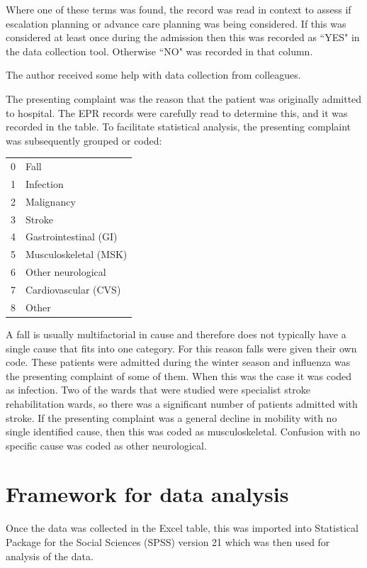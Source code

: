 \documentclass
[
	12pt,
	a4paper,
	oneside,
]{report}
\begin{document}
Where one of these terms was found, the record was read in context to assess if 
escalation planning or advance care planning was being considered. If this
was considered at least once during the admission then this was recorded as 
``YES"
in the data collection tool. Otherwise ``NO" was recorded in that column.

The author received some help with data collection from colleagues.

The presenting complaint was the reason that the patient was originally 
admitted to hospital. The EPR records were carefully read to determine this,
and it was recorded in the table. To facilitate statistical analysis, the 
presenting complaint was subsequently grouped or coded:

\begin{tabular}{ r l }
0 & Fall \\
1 & Infection \\
2 & Malignancy \\
3 & Stroke \\
4 & Gastrointestinal (GI) \\
5 & Musculoskeletal (MSK) \\
6 & Other neurological \\
7 & Cardiovascular (CVS) \\
8 & Other \\
\end{tabular}

A fall is usually multifactorial in cause \parencite{silver:12} and therefore
does not typically have a single cause that fits into one category. For this 
reason falls were given their own code.
These patients were admitted during the winter season and influenza was the
presenting complaint of some of them. When this was the case it was coded as
infection. Two of the wards that were studied were specialist stroke 
rehabilitation wards, so there was a significant number of patients admitted
with stroke. If the presenting complaint was a general decline in mobility 
with no single identified cause, then this was coded as musculoskeletal.
Confusion with no specific cause was coded as other neurological.

\section{Framework for data analysis}

Once the data was collected in the Excel table, this was imported into 
Statistical Package for the Social Sciences (SPSS) version 21 which was then
used for analysis of the data.
\end{document}
